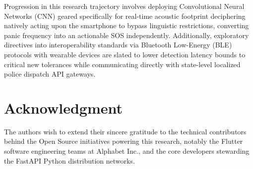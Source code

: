\documentclass[10pt,journal,compsoc]{IEEEtran}
\begin{document}
Progression in this research trajectory involves deploying Convolutional Neural Networks (CNN) geared specifically for real-time acoustic footprint deciphering natively acting upon the smartphone to bypass linguistic restrictions, converting panic frequency into an actionable SOS independently. Additionally, exploratory directives into interoperability standards via Bluetooth Low-Energy (BLE) protocols with wearable devices are slated to lower detection latency bounds to critical new tolerances while communicating directly with state-level localized police dispatch API gateways.

\section*{Acknowledgment}
The authors wish to extend their sincere gratitude to the technical contributors behind the Open Source initiatives powering this research, notably the Flutter software engineering teams at Alphabet Inc., and the core developers stewarding the FastAPI Python distribution networks. 
\end{document}
